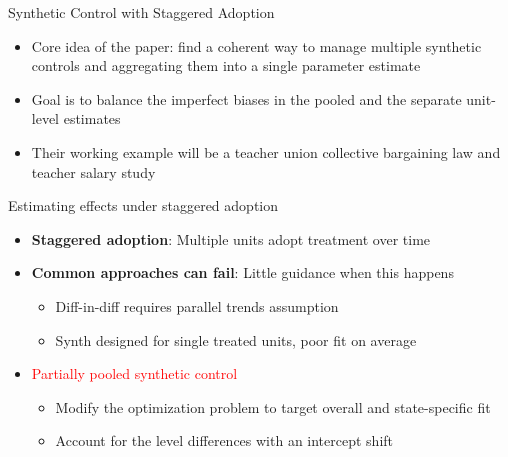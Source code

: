 \documentclass{beamer}
\begin{document}
\begin{frame}{Synthetic Control with Staggered Adoption}

\begin{itemize}
\item Core idea of the paper:  find a coherent way to manage multiple synthetic controls and aggregating them into a single parameter estimate
\item Goal is to balance the imperfect biases in the pooled and the separate unit-level estimates
\item Their working example will be a teacher union collective bargaining law and teacher salary study
\end{itemize}

\end{frame}

\begin{frame}{Estimating effects under staggered adoption}

\begin{itemize}
\item \textbf{Staggered adoption}: Multiple units adopt treatment over time
\item \textbf{Common approaches can fail}: Little guidance when this happens
	\begin{itemize}
	\item Diff-in-diff requires parallel trends assumption
	\item Synth designed for single treated units, poor fit on average
	\end{itemize}
\item \textcolor{red}{Partially pooled synthetic control}
	\begin{itemize}
	\item Modify the optimization problem to target overall and state-specific fit
	\item Account for the level differences with an intercept shift
	\end{itemize}
\end{itemize}
\end{frame}


\end{document}
